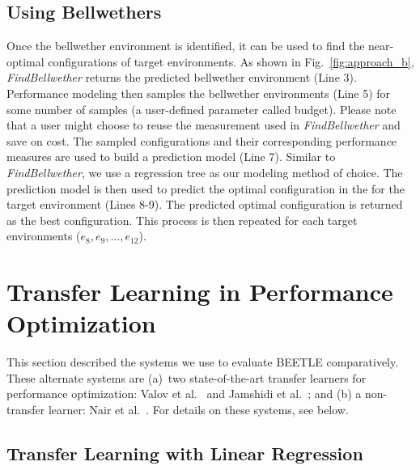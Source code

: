 \documentclass[10pt,journal,compsoc]{IEEEtran}
\begin{document}
\vspace{-0.2cm}
\subsection{Using Bellwethers}

Once the bellwether environment is identified, it can be used to find the near-optimal configurations of target environments. As shown in Fig.~\ref{fig:approach_b},   \textit{FindBellwether} returns the predicted bellwether environment (Line 3). Performance modeling then samples the bellwether environments (Line 5) for some number of samples (a user-defined parameter called budget).
Please note that a user might choose to reuse the measurement used in \textit{FindBellwether} and save on cost. The sampled configurations and their corresponding performance measures are used to build a prediction model (Line 7). Similar to \textit{FindBellwether}, we use a regression tree as our modeling method of choice. The prediction model is then used to predict the optimal configuration in the for the target environment (Lines 8-9). The predicted optimal configuration is returned as the best configuration. This process is then repeated for each target environments ($e_8, e_9,..., e_{12}$).



\vspace{-0.1cm}
\section{Transfer Learning in Performance Optimization}
\label{sect:tl}

This section described the systems we use to evaluate  BEETLE comparatively.
These alternate systems are   (a)~two state-of-the-art transfer learners for performance optimization: Valov et al.~\cite{van2017automatic} and Jamshidi et al.~\cite{jamshidi2017transfer}; and (b) a non-transfer learner: Nair et al.~\cite{nair2017using}. For details on these systems, see below.


\vspace{-0.2cm}
\subsection{Transfer Learning with Linear Regression}
\end{document}
